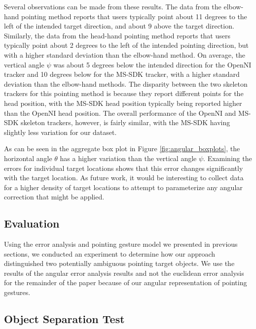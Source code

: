 \documentclass[12pt]{gatech-thesis}
\begin{document}
Several observations can be made from these results. The data from the elbow-hand pointing method reports that users typically point about 11 degrees to the left of the intended target direction, and about 9 above the target direction. Similarly, the data from the head-hand pointing method reports that users typically point about 2 degrees to the left of the intended pointing direction, but with a higher standard deviation than the elbow-hand method.  On average, the vertical angle $\psi$ was about 5 degrees below the intended direction for the OpenNI tracker and 10 degrees below for the MS-SDK tracker, with a higher standard deviation than the elbow-hand methods.  The disparity between the two skeleton trackers for this pointing method is because they report different points for the head position, with the MS-SDK head position typically being reported higher than the OpenNI head position. The overall performance of the OpenNI and MS-SDK skeleton trackers, however, is fairly similar, with the MS-SDK having slightly less variation for our dataset.

As can be seen in the aggregate box plot in Figure \ref{fig:angular_boxplots}, the horizontal angle $\theta$ has a higher variation than the vertical angle $\psi$.  Examining the errors for individual target locations shows that this error changes significantly with the target location.  As future work, it would be interesting to collect data for a higher density of target locations to attempt to parameterize any angular correction that might be applied.

\subsection{Evaluation}
\label{sec:pointing_evaluation}

Using the error analysis and pointing gesture model we presented in previous sections, we conducted an experiment to  determine how our approach distinguished two potentially ambiguous pointing target objects. We use the results of the angular error analysis results and not the euclidean error analysis for the remainder of the paper because of our angular representation of pointing gestures.


\subsection{Object Separation Test}
\end{document}
